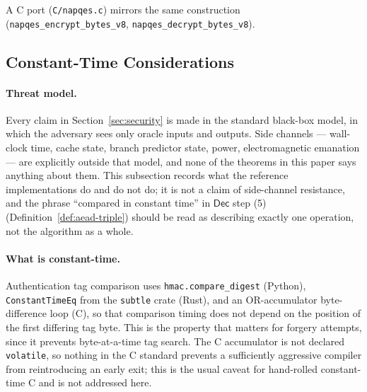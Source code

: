 \documentclass[11pt,a4paper]{article}
\begin{document}
A C port (\texttt{C/napqes.c}) mirrors the same construction
(\texttt{napqes\_encrypt\_bytes\_v8}, \texttt{napqes\_decrypt\_bytes\_v8}).

\subsection{Constant-Time Considerations}
\label{sec:constant-time}

\paragraph{Threat model.} Every claim in Section~\ref{sec:security} is made
in the standard black-box model, in which the adversary sees only oracle
inputs and outputs. Side channels — wall-clock time, cache state, branch
predictor state, power, electromagnetic emanation — are explicitly outside
that model, and none of the theorems in this paper says anything about
them. This subsection records what the reference implementations do and do
not do; it is not a claim of side-channel resistance, and the phrase
``compared in constant time'' in $\mathsf{Dec}$ step (5)
(Definition~\ref{def:aead-triple}) should be read as describing exactly one
operation, not the algorithm as a whole.

\paragraph{What is constant-time.} Authentication tag comparison uses
\texttt{hmac.compare\_digest} (Python), \texttt{ConstantTimeEq} from
the \texttt{subtle} crate (Rust), and an OR-accumulator byte-difference
loop (C), so that comparison timing does not depend on the position of the
first differing tag byte. This is the property that matters for forgery
attempts, since it prevents byte-at-a-time tag search. The C accumulator is
not declared \texttt{volatile}, so nothing in the C standard prevents a
sufficiently aggressive compiler from reintroducing an early exit; this is
the usual caveat for hand-rolled constant-time C and is not addressed here.
\end{document}
